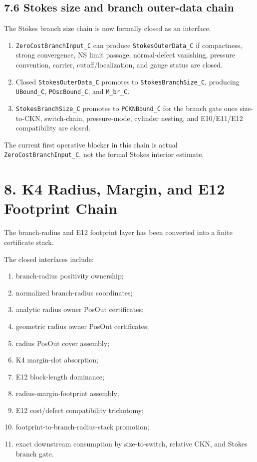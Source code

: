 \documentclass[11pt]{article}
\begin{document}
\subsection*{7.6 Stokes size and branch outer-data chain}

The Stokes branch size chain is now formally closed as an interface.

\begin{enumerate}
\item
  \texttt{ZeroCostBranchInput\_C} can produce \texttt{StokesOuterData\_C} if compactness, strong convergence, NS limit passage, normal-defect vanishing, pressure convention, carrier, cutoff/localization, and gauge status are closed.
\item
  Closed \texttt{StokesOuterData\_C} promotes to \texttt{StokesBranchSize\_C}, producing \texttt{UBound\_C}, \texttt{POscBound\_C}, and \texttt{M\_br\_C}.
\item
  \texttt{StokesBranchSize\_C} promotes to \texttt{PCKNBound\_C} for the branch gate once size-to-CKN, switch-chain, pressure-mode, cylinder nesting, and E10/E11/E12 compatibility are closed.
\end{enumerate}

The current first operative blocker in this chain is actual \texttt{ZeroCostBranchInput\_C}, not the formal Stokes interior estimate.

\section*{8. K4 Radius, Margin, and E12 Footprint Chain}

The branch-radius and E12 footprint layer has been converted into a finite certificate stack.

The closed interfaces include:

\begin{enumerate}
\item
  branch-radius positivity ownership;
\item
  normalized branch-radius coordinates;
\item
  analytic radius owner PosOut certificates;
\item
  geometric radius owner PosOut certificates;
\item
  radius PosOut cover assembly;
\item
  K4 margin-slot absorption;
\item
  E12 block-length dominance;
\item
  radius-margin-footprint assembly;
\item
  E12 cost/defect compatibility trichotomy;
\item
  footprint-to-branch-radius-stack promotion;
\item
  exact downstream consumption by size-to-switch, relative CKN, and Stokes branch gate.
\end{enumerate}
\end{document}
